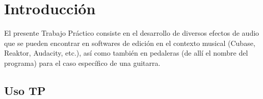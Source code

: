 \section{Introducción}
\label{sec:introduccion}

\indent El presente Trabajo Práctico consiste en el desarrollo de diversos efectos de audio que se pueden encontrar en softwares de edición en el contexto musical (Cubase, Reaktor, Audacity, etc.), así como también en pedaleras (de allí el nombre del programa) para el caso específico de una guitarra. 



\newpage

\newpage


\newpage
\subsection{Uso TP} 

\newpage

\newpage

\newpage

